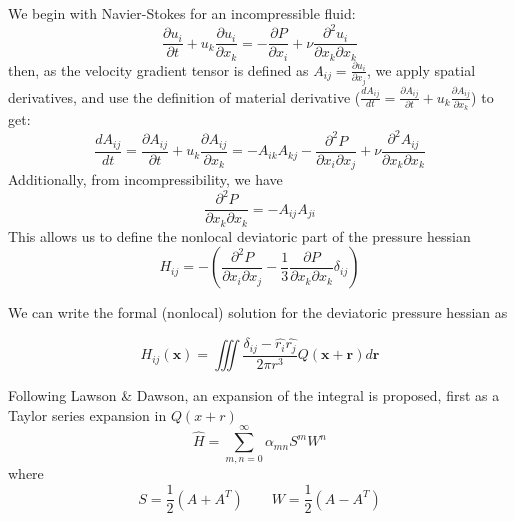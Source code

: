 We begin with Navier-Stokes for an incompressible fluid:
\begin{equation} \label{eq:NS}
  \frac{\partial u_i}{\partial t} + u_k \frac{\partial u_i}{\partial x_k} = -\frac{\partial P}{\partial x_i} + \nu \frac{\partial^2 u_i}{\partial x_k \partial x_k}
\end{equation}
then, as the velocity gradient tensor is defined as $A_{ij} = \frac{\partial u_i}{\partial x_j}$, we apply spatial derivatives, and use the definition of material derivative ($\frac{dA_{ij}}{dt} = \frac{\partial A_{ij}}{\partial t} + u_k\frac{\partial A_{ij}}{\partial x_k}$) to get:
\begin{equation}
  \frac{dA_{ij}}{dt} = \frac{\partial A_{ij}}{\partial t} + u_k \frac{\partial A_{ij}}{\partial x_k} = - A_{ik}A_{kj} - \frac{\partial^2 P}{\partial x_i \partial x_j} + \nu \frac{\partial^2 A_{ij}}{\partial x_k \partial x_k}
\end{equation}
Additionally, from incompressibility, we have
\begin{equation}
  \frac{\partial^2 P}{\partial x_k \partial x_k} = - A_{ij}A_{ji}
\end{equation}
This allows us to define the nonlocal deviatoric part of the pressure hessian
\begin{equation}
  H_{ij} = - \left( \frac{\partial^2 P}{\partial x_i \partial x_j} - \frac{1}{3}\frac{\partial P}{\partial x_k \partial x_k}\delta_{ij}  \right)
\end{equation}

We can write the formal (nonlocal) solution for the deviatoric pressure hessian as\cite{ohkitani1995}

\begin{equation}
  H_{ij}(\textbf{x}) = \iiint \frac{\delta_{ij} - \hat{r_i}\hat{r_j}}{2\pi r^3}Q(\textbf{x} + \textbf{r})d\textbf{r}
\end{equation}

Following Lawson \& Dawson\cite{lawson2015}, an expansion of the integral is proposed, first as a Taylor series expansion in $Q(x+r)$
\begin{equation}
  \hat{H} = \sum_{m,n = 0}^\infty \alpha_{mn}S^mW^n
\end{equation}
where
\begin{equation}
  S = \frac{1}{2}(A + A^T) \qquad W = \frac{1}{2}(A - A^T)
\end{equation}

